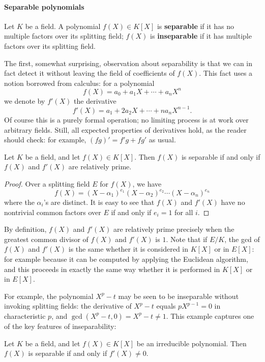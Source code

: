 \paragraph{Separable polynomials}
\begin{definition}
Let $K$ be a field. A polynomial $f(X)\in K[X]$ is \textbf{separable} if it has no multiple factors over its splitting field; $f(X)$ is \textbf{inseparable} if it has multiple factors over its splitting field.
\end{definition}
The first, somewhat surprising, observation about separability is that we can in fact detect it without leaving the field of coefficients of $f(X)$. This fact uses a notion borrowed from calculus: for a polynomial
\[f(X)=a_0+a_1X+\cdots+a_nX^n\]
we denote by $f'(X)$ the derivative
\[f'(X)=a_1+2a_2X+\cdots+na_nX^{n-1}.\]
Of course this is a purely formal operation; no limiting process is at work over arbitrary fields. Still, all expected properties of derivatives hold, as the reader should check: for example, $(fg)'=f'g+fg'$ as usual.
\begin{proposition}\label{poloynomial separable iff f' coprime to f}
Let $K$ be a field, and let $f(X)\in K[X]$. Then $f(X)$ is separable if and only if $f(X)$ and $f'(X)$ are relatively prime.
\end{proposition}
\begin{proof}
Over a splitting field $E$ for $f(X)$, we have
\[f(X)=(X-\alpha_1)^{e_1}(X-\alpha_2)^{e_2}\cdots(X-\alpha_n)^{e_n}\]
where the $\alpha_i$'s are distinct. It is easy to see that $f(X)$ and $f'(X)$ have no nontrivial common factors over $E$ if and only if $e_i=1$ for all $i$.
\end{proof}
By definition, $f(X)$ and $f'(X)$ are relatively prime precisely when the greatest common divisor of $f(X)$ and $f'(X)$ is $1$. Note that if $E/K$, the gcd of $f(X)$ and $f'(X)$ is the same whether it is considered in $K[X]$ or in $E[X]$: for example because it can be computed by applying the Euclidean algorithm, and this proceeds in exactly the same way whether it is performed in $K[X]$ or in $E[X]$.\par
For example, the polynomial $X^p-t$ may be seen to be inseparable without invoking splitting fields: the derivative of $X^p-t$ equals $pX^{p-1}=0$ in characteristic $p$, and $\gcd(X^p-t,0)=X^p-t\neq 1$. This example captures one of the key features of inseparability:
\begin{corollary}\label{insepara zero}
Let $K$ be a field, and let $f(X)\in K[X]$ be an irreducible polynomial. Then $f(X)$ is separable if and only if $f'(X)\neq 0$.
\end{corollary}
